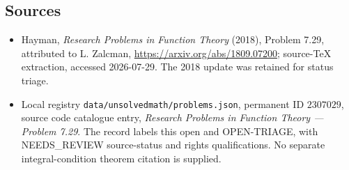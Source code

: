 \documentclass[11pt]{article}
\begin{document}
\subsection{Sources}
\begin{itemize}
\item Hayman, \emph{Research Problems in Function Theory} (2018), Problem 7.29, attributed to L. Zalcman, \url{https://arxiv.org/abs/1809.07200}; source-TeX extraction, accessed 2026-07-29. The 2018 update was retained for status triage.
\item Local registry \texttt{data/unsolvedmath/problems.json}, permanent ID $2307029$, source code catalogue entry, \emph{Research Problems in Function Theory --- Problem 7.29}. The record labels this open and OPEN-TRIAGE, with NEEDS\_REVIEW source-status and rights qualifications. No separate integral-condition theorem citation is supplied.
\end{itemize}
\end{document}
